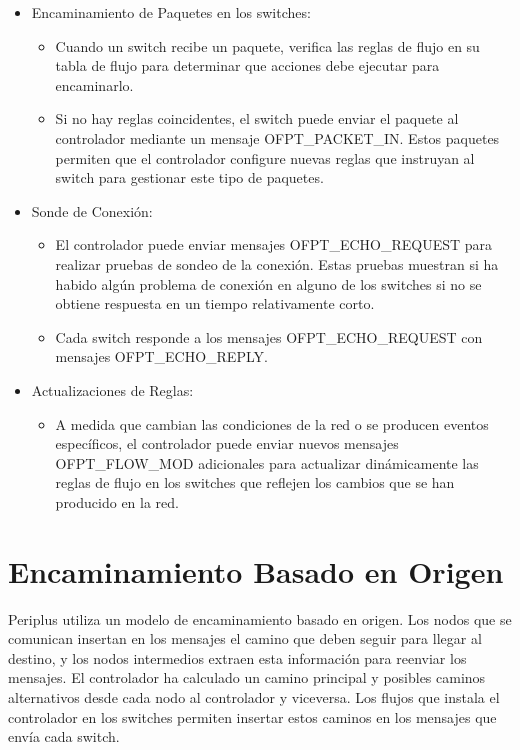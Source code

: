 \documentclass[a4paper, 12pt]{book}
\begin{document}
\begin{itemize}
		
		\item Encaminamiento de Paquetes en los switches:
		\begin{itemize}
			\item Cuando un switch recibe un paquete, verifica las reglas de flujo en su tabla de
			flujo para determinar que acciones debe ejecutar para encaminarlo.
			\item Si no hay reglas coincidentes, el switch puede enviar el paquete al controlador
			mediante un mensaje OFPT\_PACKET\_IN. Estos paquetes permiten que el controlador configure nuevas reglas que instruyan al switch para gestionar este tipo de paquetes.
		\end{itemize}
		
		\item Sonde de Conexión:
		\sloppy
		\begin{itemize}
			\item El controlador puede enviar mensajes OFPT\_ECHO\_REQUEST para realizar pruebas de sondeo de la conexión. Estas pruebas muestran si ha habido algún problema de conexión en alguno de los switches si no se obtiene respuesta en un tiempo relativamente corto.
		\item Cada switch responde a los mensajes OFPT\_ECHO\_REQUEST con mensajes OFPT\_ECHO\_REPLY.
		\end{itemize}
		\fussy
		
		\item Actualizaciones de Reglas:
		\begin{itemize}
			\item A medida que cambian las condiciones de la red o se producen eventos específicos,
			el controlador puede enviar nuevos mensajes OFPT\_FLOW\_MOD adicionales para actualizar
			dinámicamente las reglas de flujo en los switches que reflejen los cambios que se han producido en la red.
		\end{itemize}
	\end{itemize}
	
	\section{Encaminamiento Basado en Origen}
	Periplus utiliza un modelo de encaminamiento basado en origen. Los nodos que se comunican insertan en los mensajes el camino que deben seguir para llegar al destino, y los nodos intermedios extraen esta información para reenviar los mensajes. El controlador ha calculado un camino principal y
	posibles caminos alternativos desde cada nodo al controlador y viceversa. Los flujos que instala el controlador en los switches
	permiten insertar estos	caminos	en los mensajes	que	envía cada switch.
	
\end{document}
